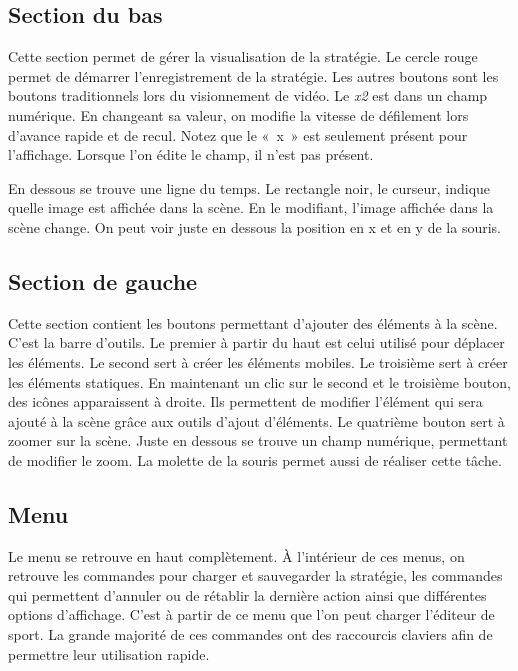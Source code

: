 \subsection{Section du bas}

Cette section permet de gérer la visualisation de la stratégie. Le cercle rouge permet de démarrer l'enregistrement de la stratégie. Les autres boutons sont les boutons traditionnels lors du visionnement de vidéo. Le \textit{x2} est dans un champ numérique. En changeant sa valeur, on modifie la vitesse de défilement lors d'avance rapide et de recul. Notez que le «~x~» est seulement présent pour l'affichage. Lorsque l'on édite le champ, il n'est pas présent.

En dessous se trouve une ligne du temps. Le rectangle noir, le curseur, indique quelle image est affichée dans la scène. En le modifiant, l'image affichée dans la scène change. On peut voir juste en dessous la position en x et en y de la souris.

\subsection{Section de gauche}

Cette section contient les boutons permettant d'ajouter des éléments à la scène. C'est la barre d'outils. Le premier à partir du haut est celui utilisé pour déplacer les éléments. Le second sert à créer les éléments mobiles. Le troisième sert à créer les éléments statiques. En maintenant un clic sur le second et le troisième bouton, des icônes apparaissent à droite. Ils permettent de modifier l'élément qui sera ajouté à la scène grâce aux outils d'ajout d'éléments. Le quatrième bouton sert à zoomer sur la scène. Juste en dessous se trouve un champ numérique, permettant de modifier le zoom. La molette de la souris permet aussi de réaliser cette tâche.

\subsection{Menu}

Le menu se retrouve en haut complètement. À l'intérieur de ces menus, on retrouve les commandes pour charger et sauvegarder la stratégie, les commandes qui permettent d'annuler ou de rétablir la dernière action ainsi que différentes options d'affichage. C'est à partir de ce menu que l'on peut charger l'éditeur de sport. La grande majorité de ces commandes ont des raccourcis claviers afin de permettre leur utilisation rapide.

